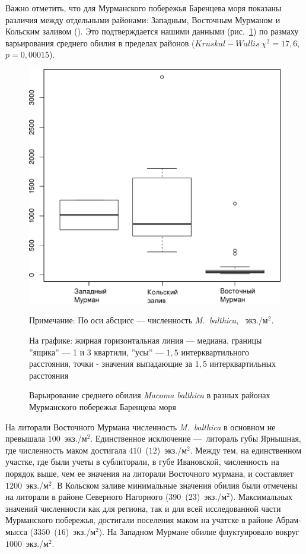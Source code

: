 Важно отметить, что для Мурманского побережья Баренцева моря показаны различия между отдельными районами: Западным, Восточным Мурманом и Кольским заливом (\cite{Guryanova_Ushakov_1929, Guryanova_et_al_1930}). 
Это подтверждается нашими данными (рис.~\ref{ris:N_region_Barents}) по размаху варьирования среднего обилия в пределах районов ($Kruskal-Wallis\ \chi^2 = 17,6$, $p = 0,00015$).
%
	\begin{figure}[h]
		\includegraphics{../All_N/Nmean_region_Barents1.pdf}
	\caption{Варьирование среднего обилия {\it Macoma balthica} в разных районах Мурманского побережья Баренцева моря}
	{\footnotesize Примечание: По оси абсцисс --- численность {\it M.~balthica}, ~экз./м$^2$.

	На графике: жирная горизонтальная линия --- медиана, границы ''ящика'' --- 1 и 3 квартили, ''усы'' --- $1,5$ интерквартильного расстояния, точки - значения выпадающие за $1,5$ интерквартильных расстояния}
	\label{ris:N_region_Barents}
	\end{figure}
%
На литорали Восточного Мурмана численность {\it M.~balthica} в основном не превышала $100$~экз./м$^2$. 
Единственное исключение ---\ литораль губы Ярнышная, где численность маком достигала $410$~($12$)~экз./м$^2$. 
Между тем, на единственном участке, где были учеты в сублиторали, в губе Ивановской, численность на порядок выше, чем ее значения на литорали Восточного мурмана, и составляет $1200$~экз./м$^2$. 
В Кольском заливе минимальные значения обилия были отмечены на литорали в районе Северного Нагорного ($390$~($23$)~экз./м$^2$). 
Максимальных значений численности как для региона, так и для всей исследованной части Мурманского побережья, достигали поселения маком на учатске в районе Абрам-мысса ($3350$~($16$)~экз./м$^2$). 
На Западном Мурмане обилие флуктуировало вокруг $1000$~экз./м$^2$.  

